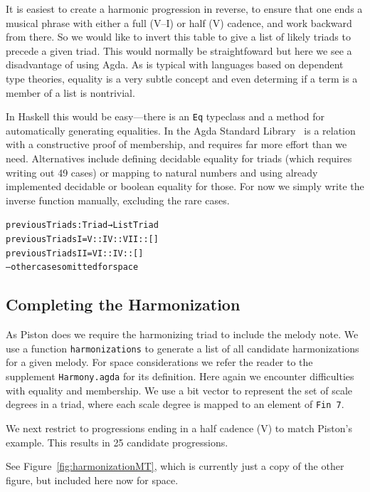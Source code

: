 It is easiest to create a harmonic progression in reverse, to
ensure that one ends a musical phrase with either a full (V--I) or half (V)
cadence, and work backward from there. So we would like to invert this
table to give a list of likely triads to precede a given triad. This
would normally be straightfoward but here we see a disadvantage of
using Agda. As is typical with languages based on dependent type
theories, equality is a very subtle concept and even determing if a
term is a member of a list is nontrivial.

In Haskell this would be easy---there is an \texttt{Eq} typeclass and a
method for automatically generating equalities. In the Agda Standard
Library~\citep{agda-stdlib} is a relation with a constructive proof of
membership, and requires far more effort than we need. Alternatives
include defining decidable equality for triads (which requires writing
out 49 cases) or mapping to natural numbers and using already
implemented decidable or boolean equality for those. For now we simply
write the inverse function manually, excluding the rare cases.

\begin{alltt}
previousTriads : Triad → List Triad
previousTriads I   = V :: IV :: VII :: []
previousTriads II  = VI :: IV :: []
-- other cases omitted for space
\end{alltt}

\subsection{Completing the Harmonization}
\label{sec:harmony:complete}

As Piston does we require the harmonizing triad to include the melody
note. We use a function \texttt{harmonizations} to generate a list of
all candidate harmonizations for a given melody. For space
considerations we refer the reader to the supplement
\texttt{Harmony.agda} for its definition. Here again we encounter difficulties
with equality and membership. We use a bit vector to represent the
set of scale degrees in a triad, where each scale degree is mapped to
an element of \texttt{Fin 7}.

We next restrict to progressions ending in a half cadence (V) to match
Piston's example. This results in 25 candidate progressions.

See Figure~\ref{fig:harmonizationMT}, which is currently just a copy of
the other figure, but included here now for space.

\HarmonizationMT

